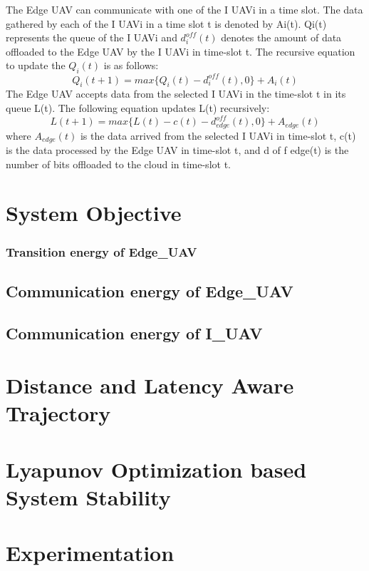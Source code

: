 \documentclass{article}
\begin{document}
\begin{multicols}{2}
{The Edge UAV can communicate with one of the I UAVi in a time slot. The data gathered by each of the I UAVi in a time slot t is denoted by Ai(t). Qi(t) represents the queue of the I UAVi and $d^{off}_{i}(t)$ denotes the amount of data offloaded to the Edge UAV by the I UAVi in time-slot t. The recursive equation to update the $Q_i(t)$ is as follows:
\begin{equation}
    Q_i(t+1) = max\{Q_i(t)-d^{off}_{i}(t), 0\}+A_i(t)
\end{equation}
The Edge UAV accepts data from the selected I UAVi
in the time-slot t in its queue L(t). The following equation
updates L(t) recursively:
\begin{equation}
    L(t + 1) = max\{L(t)-c(t)-d^{off}_{edge}(t), 0\}+A_{edge}(t)
\end{equation}
where $A_{edge}(t)$ is the data arrived from the selected I UAVi in time-slot t, c(t) is the data processed by the Edge UAV in time-slot t, and d of f edge(t) is the number of bits offloaded to the cloud in time-slot t.


\section{System Objective}
\subsubsection{Transition energy of Edge\_UAV}
\subsection{Communication energy of Edge\_UAV}
\subsection{Communication energy of I\_UAV}
\cite{lu2018beyond}
\section{Distance and Latency Aware Trajectory}



\section{Lyapunov Optimization based System Stability}
\cite{MichelNeeley2018}

\section{Experimentation}

}
\end{multicols}
\end{document}
